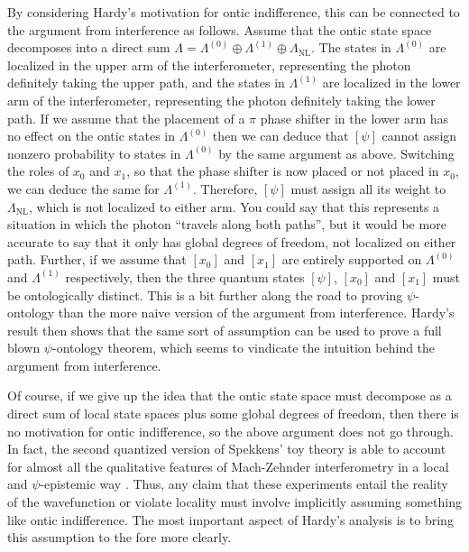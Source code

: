 \documentclass[DIV=calc,paper=a4,fontsize=11pt,twocolumn]{scrartcl} %
\theoremstyle{definition}
\theoremstyle{plain}
\newcommand{\Proj}[1]{\ensuremath{\left [ #1 \right ]}}
\begin{document}
By considering Hardy's motivation for ontic indifference, this can be
connected to the argument from interference as follows.  Assume that
the ontic state space decomposes into a direct sum $\Lambda =
\Lambda^{(0)} \oplus \Lambda^{(1)} \oplus \Lambda_{\text{NL}}$.  The
states in $\Lambda^{(0)}$ are localized in the upper arm of the
interferometer, representing the photon definitely taking the upper
path, and the states in $\Lambda^{(1)}$ are localized in the lower arm
of the interferometer, representing the photon definitely taking the
lower path.  If we assume that the placement of a $\pi$ phase shifter
in the lower arm has no effect on the ontic states in $\Lambda^{(0)}$
then we can deduce that $\Proj{\psi}$ cannot assign nonzero
probability to states in $\Lambda^{(0)}$ by the same argument as
above.  Switching the roles of $x_0$ and $x_1$, so that the phase
shifter is now placed or not placed in $x_0$, we can deduce the same
for $\Lambda^{(1)}$.  Therefore, $\Proj{\psi}$ must assign all its
weight to $\Lambda_{\text{NL}}$, which is not localized to either arm.
You could say that this represents a situation in which the photon
``travels along both paths'', but it would be more accurate to say
that it only has global degrees of freedom, not localized on either
path.  Further, if we assume that $\Proj{x_0}$ and $\Proj{x_1}$ are
entirely supported on $\Lambda^{(0)}$ and $\Lambda^{(1)}$
respectively, then the three quantum states $\Proj{\psi}$,
$\Proj{x_0}$ and $\Proj{x_1}$ must be ontologically distinct.  This is
a bit further along the road to proving $\psi$-ontology than the more
naive version of the argument from interference.  Hardy's result then
shows that the same sort of assumption can be used to prove a full
blown $\psi$-ontology theorem, which seems to vindicate the intuition
behind the argument from interference.

Of course, if we give up the idea that the ontic state space must
decompose as a direct sum of local state spaces plus some global
degrees of freedom, then there is no motivation for ontic
indifference, so the above argument does not go through.  In fact, the
second quantized version of Spekkens' toy theory is able to account
for almost all the qualitative features of Mach-Zehnder interferometry
in a local and $\psi$-epistemic way \cite{Martin2014}.  Thus, any
claim that these experiments entail the reality of the wavefunction or
violate locality must involve implicitly assuming something like ontic
indifference.  The most important aspect of Hardy's analysis is to
bring this assumption to the fore more clearly.
\end{document}
